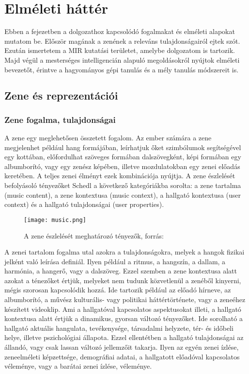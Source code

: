 \chapter{Elméleti háttér} 
\label{ch:theory}

Ebben a fejezetben a dolgozathoz kapcsolódó fogalmakat és elméleti alapokat mutatom be. Először magának a zenének a releváns tulajdonságairól ejtek szót. Ezután ismertetem a MIR kutatási területet, amelybe dolgozatom is tartozik. Majd végül a mesterséges intelligencián alapuló megoldásokról nyújtok elméleti bevezetőt, érintve a hagyományos gépi tanulás és a mély tanulás módszereit is.

\section{Zene és reprezentációi} 

\subsection{Zene fogalma, tulajdonságai}

A zene egy meglehetősen összetett fogalom. Az ember számára a zene megjelenhet például hang formájában, leírhatjuk őket szimbólumok segítségével egy kottában, előfordulhat szöveges formában dalszövegként, képi formában egy albumborító, vagy egy zenész képében, illetve mozdulatokban egy zenei előadás keretében. A teljes zenei élményt ezek kombinációja nyújtja. A zene észlelését befolyásoló tényezőket Schedl \cite{Schedl2013} a következő kategóriákba sorolta: a zene tartalma (music content), a zene kontextusa (music context), a hallgató kontextusa (user context) és a hallgató tulajdonságai (user properties). \cite{Schedl2014}

\begin{figure}[H]
  \texttt{[image: music.png]}
  \centering
  \caption{A zene észlelését meghatározó tényezők, forrás: \cite{Schedl2013} }
\end{figure}

A zenei tartalom fogalma utal azokra a tulajdonságokra, melyek a hangok fizikai jelként való leírása definiál. Ilyen például a ritmus, a hangszín, a dallam, a harmónia, a hangerő, vagy a dalszöveg. Ezzel szemben a zene kontextusa alatt azokat a ténezőket értjük, melyeket nem tudunk közvetlenül a zenéből kinyerni, mégis szorosan kapcsolódik hozzá. Ide tartozik például az előadó hírneve, az albumborító, a művész kulturális- vagy politikai háttértörténete, vagy a zeneéhez készített videoklip. Ami a hallgatóval kapcsolatos aspektusokat illeti, a hallgató kontextusa alatt értjük a dinamikus, gyorsan változó tényezőket. Ide sorolható a hallgató aktuális hangulata, tevékenysége, társadalmi helyzete, tér- és időbeli helye, illetve pszichológiai állapota. Ezzel ellentétben a hallgató tulajdonságai az állandó, vagy csak lassan változó jellemzőit takarja. Ilyen az egyén zenei ízlése, zeneelméleti képzettsége, demográfiai adatai, a hallgatott előadóval kapcsolatos véleménye, vagy a barátai zenei ízlése, véleménye. \cite{Schedl2014}

